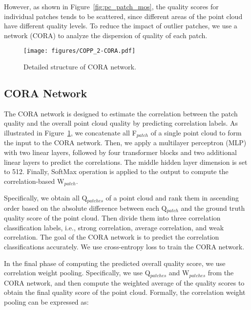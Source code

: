 \documentclass[conference]{IEEEtran}
\begin{document}
However, as shown in Figure~\ref{fig:pc_patch_mos}, the quality scores for individual patches tends to be scattered, since different areas of the point cloud have different quality levels. To reduce the impact of outlier patches, we use a network (CORA) to analyze the dispersion of quality of each patch.




\begin{figure}[t]             \begin{center}
    \texttt{[image: figures/COPP\_2-CORA.pdf]}
\end{center}
\vspace{-0.1cm}
   \caption{Detailed structure of CORA network.}
\label{fig:CORA}
\end{figure}




\subsection{CORA Network}
The CORA network is designed to estimate the correlation between the patch quality and the overall point cloud quality by predicting correlation labels. As illustrated in Figure~\ref{fig:CORA}, we concatenate all F$_{patch}$ of a single point cloud to form the input to the CORA network. Then, we apply a multilayer perceptron (MLP) with two linear layers, followed by four transformer blocks and two additional linear layers to predict the correlations. The middle hidden layer dimension is set to 512. Finally, SoftMax operation is applied to the output to compute the correlation-based W$_{patch}$.

Specifically, we obtain all Q$_{patches}$ of a point cloud and rank them in ascending order based on the absolute difference between each Q$_{patch}$ and the ground truth quality score of the point cloud.
Then divide them into three correlation classification labels, i.e., strong correlation, average correlation, and weak correlation. The goal of the CORA network is to predict the correlation classifications accurately. We use cross-entropy loss to train the CORA network.

In the final phase of computing the predicted overall quality score, we use correlation weight pooling. Specifically, we use Q$_{patches}$ and W$_{patches}$ from the CORA network, and then compute the weighted average of the quality scores to obtain the final quality score of the point cloud. Formally, the correlation weight pooling can be expressed as:
\end{document}
